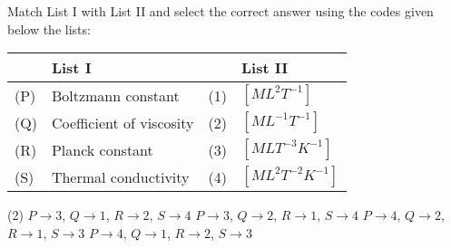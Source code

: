 \item Match List I with List II and select the correct answer using the codes given below the lists:

\begin{center}
    \renewcommand{\arraystretch}{2}
    \begin{table}[h]
        \centering
        \begin{tabular}{p{0.25cm}p{8cm}|p{0.25cm}p{5cm}}
        \hline
        & List I & & List II \\
        \hline
        (P)& Boltzmann constant & (1) & $[ML^2T^{-1}]$ \\
        (Q)& Coefficient of viscosity & (2) & $[ML^{-1}T^{-1}]$ \\
        (R)& Planck constant & (3) & $[MLT^{-3}K^{-1}]$ \\
        (S)& Thermal conductivity & (4) & $[ML^2T^{-2}K^{-1}]$ \\
        \hline
        \end{tabular}
    \end{table}
\end{center}

\begin{tasks}(2)
    \task $P \rightarrow 3$, $Q \rightarrow 1$, $R \rightarrow 2$, $S \rightarrow 4$
    \task $P \rightarrow 3$, $Q \rightarrow 2$, $R \rightarrow 1$, $S \rightarrow 4$
    \task $P \rightarrow 4$, $Q \rightarrow 2$, $R \rightarrow 1$, $S \rightarrow 3$
    \task $P \rightarrow 4$, $Q \rightarrow 1$, $R \rightarrow 2$, $S \rightarrow 3$
\end{tasks}